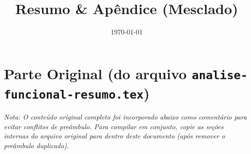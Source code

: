 \documentclass[11pt,a4paper]{article}
\title{Resumo \& Apêndice (Mesclado)}
\author{}
\date{\today}
\theoremstyle{mystyle}
\theoremstyle{defstyle}
\begin{document}
\maketitle

\tableofcontents

\section{Parte Original (do arquivo \texttt{analise-funcional-resumo.tex})}

\noindent\textit{Nota: O conteúdo original completo foi incorporado abaixo como comentário para evitar conflitos de preâmbulo. Para compilar em conjunto, copie as seções internas do arquivo original para dentro deste documento (após remover o preâmbulo duplicado).}

\bigskip
\end{document}
